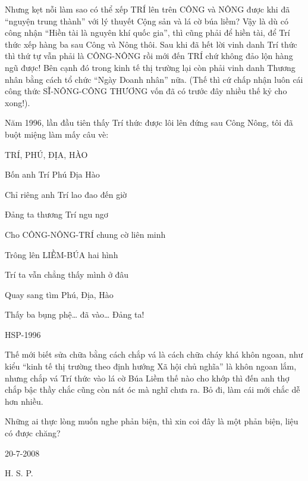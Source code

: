Nhưng kẹt nỗi làm sao có thể xếp TRÍ lên trên CÔNG và NÔNG được khi đã “nguyện trung thành” với lý thuyết Cộng sản và lá cờ búa liềm? Vậy là dù có công nhận “Hiền tài là nguyên khí quốc gia”, thì cũng phải để hiền tài, để Trí thức xếp hàng ba sau Công và Nông thôi. Sau khi đã hết lời vinh danh Trí thức thì thứ tự vẫn phải là CÔNG-NÔNG rồi mới đến TRÍ chứ không đảo lộn hàng ngũ được! Bên cạnh đó trong kinh tế thị trường lại còn phải vinh danh Thương nhân bằng cách tổ chức “Ngày Doanh nhân” nữa. (Thế thì cứ chấp nhận luôn cái công thức SĨ-NÔNG-CÔNG THƯƠNG vốn đã có trước đây nhiều thế kỷ cho xong!).

Năm 1996, lần đầu tiên thấy Trí thức được lôi lên đứng sau Công Nông, tôi đã buột miệng làm mấy câu vè:

TRÍ, PHÚ, ĐỊA, HÀO

Bốn anh Trí Phú Địa Hào

Chỉ riêng anh Trí lao đao đến giờ

Đảng ta thương Trí ngu ngơ

Cho CÔNG-NÔNG-TRÍ chung cờ liên minh

Trông lên LIỀM-BÚA hai hình

Trí ta vẫn chẳng thấy mình ở đâu

Quay sang tìm Phú, Địa, Hào

Thấy ba bụng phệ… đã vào… Đảng ta!

HSP-1996

Thế mới biết sửa chữa bằng cách chắp vá là cách chữa cháy khá khôn ngoan, như kiểu “kinh tế thị trường theo định hướng Xã hội chủ nghĩa” là khôn ngoan lắm, nhưng chắp vá Trí thức vào lá cờ Búa Liềm thế nào cho khớp thì đến anh thợ chắp bậc thầy chắc cũng còn nát óc mà nghĩ chưa ra. Bỏ đi, làm cái mới chắc dễ hơn nhiều.

Những ai thực lòng muốn nghe phản biện, thì xin coi đây là một phản biện, liệu có được chăng?

20-7-2008

H. S. P.